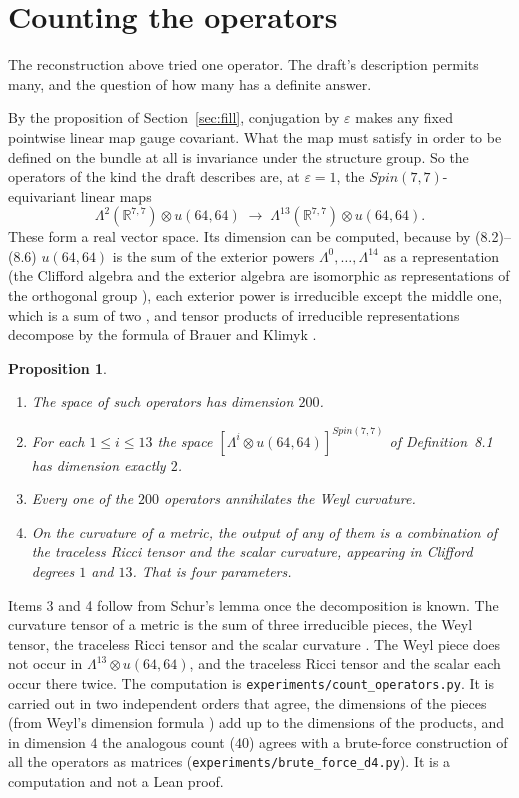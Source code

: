 \documentclass[11pt]{article}
\newtheorem{proposition}[theorem]{Proposition}
\theoremstyle{remark}
\newcommand{\eps}{\varepsilon}
\newcommand{\lean}[1]{\texttt{#1}}
\begin{document}
\section{Counting the operators}\label{sec:count}

The reconstruction above tried one operator. The draft's description permits many, and the
question of how many has a definite answer.

By the proposition of Section~\ref{sec:fill}, conjugation by $\eps$ makes any fixed pointwise
linear map gauge covariant. What the map must satisfy in order to be defined on the bundle at
all is invariance under the structure group. So the operators of the kind the draft describes
are, at $\eps=1$, the $Spin(7,7)$-equivariant linear maps
\[
\Lambda^2(\mathbb R^{7,7})\otimes u(64,64)\;\longrightarrow\;\Lambda^{13}(\mathbb
R^{7,7})\otimes u(64,64).
\]
These form a real vector space. Its dimension can be computed, because by (8.2)--(8.6)
$u(64,64)$ is the sum of the exterior powers $\Lambda^0,\dots,\Lambda^{14}$ as a representation
(the Clifford algebra and the exterior algebra are isomorphic as representations of the
orthogonal group \cite[Chapter~I, Section~1]{LM}), each exterior power is irreducible except
the middle one, which is a sum of two \cite[Section~19.2]{FH}, and tensor products of
irreducible representations decompose by the formula of Brauer and Klimyk
\cite{Brauer,Klimyk}.

\begin{proposition}\label{prop:count}
\begin{enumerate}
\item The space of such operators has dimension $200$.
\item For each $1\le i\le 13$ the space $[\Lambda^i\otimes u(64,64)]^{Spin(7,7)}$ of
Definition~8.1 has dimension exactly $2$.
\item Every one of the $200$ operators annihilates the Weyl curvature.
\item On the curvature of a metric, the output of any of them is a combination of the
traceless Ricci tensor and the scalar curvature, appearing in Clifford degrees $1$ and $13$.
That is four parameters.
\end{enumerate}
\end{proposition}

Items 3 and 4 follow from Schur's lemma \cite[Section~1.2]{FH} once the decomposition is known.
The curvature tensor of a metric is the sum of three irreducible pieces, the Weyl tensor, the
traceless Ricci tensor and the scalar curvature \cite[Section~1.G]{Besse}. The Weyl piece does
not occur in $\Lambda^{13}\otimes u(64,64)$, and the traceless Ricci tensor and the scalar each
occur there twice. The computation is
\lean{experiments/count\_operators.py}. It is carried out in two independent orders that
agree, the dimensions of the pieces (from Weyl's dimension formula \cite[Section~24.1]{FH}) add
up to the dimensions of the products, and in dimension
$4$ the analogous count ($40$) agrees with a brute-force construction of all the operators as
matrices (\lean{experiments/brute\_force\_d4.py}). It is a computation and not a Lean proof.
\end{document}
